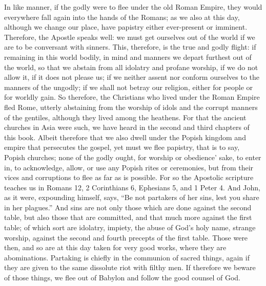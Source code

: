 In like manner, if the godly were to flee under the old Roman Empire, they would everywhere fall again into the hands of the Romans; as we also at this day, although we change our place, have papistry either ever-present or imminent. Therefore, the Apostle speaks well: we must get ourselves out of the world if we are to be conversant with sinners. This, therefore, is the true and godly flight: if remaining in this world bodily, in mind and manners we depart furthest out of the world, so that we abstain from all idolatry and profane worship, if we do not allow it, if it does not please us; if we neither assent nor conform ourselves to the manners of the ungodly; if we shall not betray our religion, either for people or for worldly gain. So therefore, the Christians who lived under the Roman Empire fled Rome, utterly abstaining from the worship of idols and the corrupt manners of the gentiles, although they lived among the heathens. For that the ancient churches in Asia were such, we have heard in the second and third chapters of this book. Albeit therefore that we also dwell under the Popish kingdom and empire that persecutes the gospel, yet must we flee papistry, that is to say, Popish churches; none of the godly ought, for worship or obedience’ sake, to enter in, to acknowledge, allow, or use any Popish rites or ceremonies, but from their vices and corruptions to flee as far as is possible. For so the Apostolic scripture teaches us in Romans 12, 2 Corinthians 6, Ephesians 5, and 1 Peter 4. And John, as it were, expounding himself, says, “Be not partakers of her sins, lest you share in her plagues.” And sins are not only those which are done against the second table, but also those that are committed, and that much more against the first table; of which sort are idolatry, impiety, the abuse of God’s holy name, strange worship, against the second and fourth precepts of the first table. Those were then, and so are at this day taken for very good works, where they are abominations. Partaking is chiefly in the communion of sacred things, again if they are given to the same dissolute riot with filthy men. If therefore we beware of those things, we flee out of Babylon and follow the good counsel of God.

